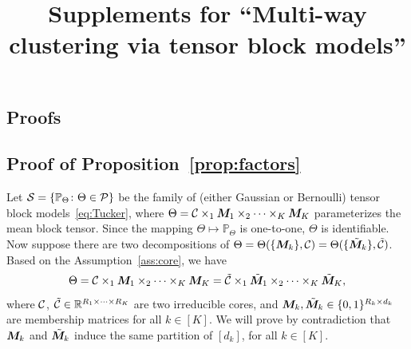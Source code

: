 \documentclass{article}
\title{Supplements for ``Multi-way clustering via tensor block models''}
\begin{document}
\maketitle

\vspace{-2cm}
\begin{appendices}
\section{Proofs}
	
\subsection{Proof of Proposition~\ref{prop:factors}}
Let $\mathcal{S}=\{\mathbb{P}_{\Theta}\colon \Theta\in\mathcal{P}\}$ be the family of (either Gaussian or Bernoulli) tensor block models~\eqref{eq:Tucker}, where $\Theta=\mathcal{C} \times_1\bm M_1\times_2\cdots\times_K\bm M_K$ parameterizes the mean block tensor. Since the mapping $\Theta\mapsto\mathbb{P}_{\Theta}$ is one-to-one, $\Theta$ is identifiable. Now suppose there are two decompositions of $\Theta=\Theta(\{\bm M_k\}, \mathcal{C})=\Theta(\{\tilde {\bm M}_k\}, \tilde {\mathcal{C}})$. Based on the Assumption~\ref{ass:core}, we have
\begin{equation}\label{eq:equality}
\Theta=\mathcal{C} \times_1\bm M_1\times_2\cdots\times_K\bm M_K=\tilde {\mathcal{C}} \times_1\tilde {\bm M}_1\times_2\cdots\times_K\tilde  {\bm M}_K,
\end{equation}
where $\mathcal{C}$, $\tilde {\mathcal{C}}\in\mathbb{R}^{R_1\times \cdots \times R_K}$ are two irreducible cores, and $\bm M_k,\tilde {\bm M}_k\in\{0,1\}^{R_k\times d_k}$ are membership matrices for all $k\in[K]$. We will prove by contradiction that $\bm M_k$ and $\tilde {\bm M}_k$ induce the same partition of $[d_k]$, for all $k\in[K]$. 


\end{appendices}
\end{document}
